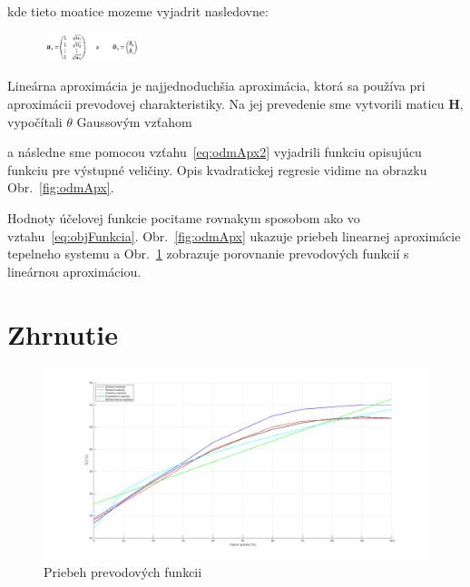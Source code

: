 \documentclass{article}
\begin{document}
kde tieto moatice mozeme vyjadrit nasledovne:

\begin{figure}[!htbp]
	\begin{center}
		\includegraphics[width=0.25\textwidth]{include/defHandTheta3.png}
	\end{center}
\end{figure}

Lineárna aproximácia je najjednoduchšia aproximácia, ktorá sa používa pri aproximácii prevodovej
charakteristiky. Na jej prevedenie sme vytvorili maticu \textbf{H}, vypočítali
\(\theta\) Gaussovým vzťahom

a následne sme pomocou vzťahu~\ref{eq:odmApx2} vyjadrili funkciu opisujúcu funkciu pre výstupné
veličiny. Opis kvadratickej regresie vidime na obrazku Obr.~\ref{fig:odmApx}.

Hodnoty účelovej funkcie pocitame rovnakym sposobom ako vo vztahu~\ref{eq:objFunkcia}.
Obr.~\ref{fig:odmApx} ukazuje priebeh linearnej aproximácie tepelneho systemu a
Obr.~\ref{fig:prevod} zobrazuje porovnanie prevodových funkcií s lineárnou aproximáciou.
\clearpage

\section{Zhrnutie}
\label{sec:zhrnutie}

\begin{figure}[!htbp]
	\begin{center}
		\includegraphics[width=\textwidth]{./include/prevodove_funkcie2.png}
		\caption{Priebeh prevodových funkcii}
		\label{fig:prevod}
	\end{center}
	\hfill
\end{figure}
\end{document}
